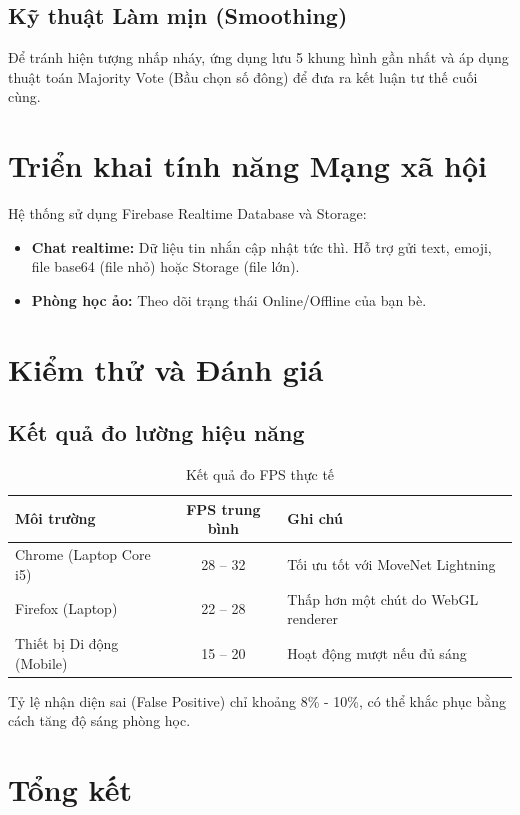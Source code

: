 \documentclass[12pt,a4paper]{article}
\begin{document}
\subsection{Kỹ thuật Làm mịn (Smoothing)}
Để tránh hiện tượng nhấp nháy, ứng dụng lưu 5 khung hình gần nhất và áp dụng thuật toán Majority Vote (Bầu chọn số đông) để đưa ra kết luận tư thế cuối cùng.

\section{Triển khai tính năng Mạng xã hội}
Hệ thống sử dụng Firebase Realtime Database và Storage:
\begin{itemize}
    \item \textbf{Chat realtime:} Dữ liệu tin nhắn cập nhật tức thì. Hỗ trợ gửi text, emoji, file base64 (file nhỏ) hoặc Storage (file lớn).
    \item \textbf{Phòng học ảo:} Theo dõi trạng thái Online/Offline của bạn bè.
\end{itemize}

\section{Kiểm thử và Đánh giá}
\subsection{Kết quả đo lường hiệu năng}
\begin{table}[H]
    \centering
    \begin{tabular}{|l|c|l|}
    \hline
    \textbf{Môi trường} & \textbf{FPS trung bình} & \textbf{Ghi chú} \\
    \hline
    Chrome (Laptop Core i5) & 28 -- 32 & Tối ưu tốt với MoveNet Lightning \\
    Firefox (Laptop) & 22 -- 28 & Thấp hơn một chút do WebGL renderer \\
    Thiết bị Di động (Mobile) & 15 -- 20 & Hoạt động mượt nếu đủ sáng \\
    \hline
    \end{tabular}
    \caption{Kết quả đo FPS thực tế}
\end{table}
Tỷ lệ nhận diện sai (False Positive) chỉ khoảng 8\% - 10\%, có thể khắc phục bằng cách tăng độ sáng phòng học.

\section{Tổng kết}
\end{document}
